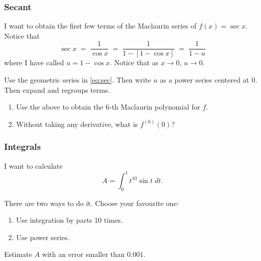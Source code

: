 \documentclass[14pt]{beamer}
\begin{document}
	\begin{frame}[t]
		\fontsize{13}{13}\selectfont
		\frametitle{Secant}

		I want to obtain the first few terms of the Maclaurin series of $\displaystyle
		f(x) = \sec x$. Notice that
		\begin{equation}
			\label{eq:sec}\sec x \; = \; \frac{1}{\cos x}\; = \; \frac{1}{1 - \left[ 1
			- \cos x\right]}\; = \; \frac{1}{1-u}
		\end{equation}
		where I have called $\displaystyle u = 1 - \cos x$. \; Notice that as $x \to
		0$, $u \to 0$.
		\vspace{.2cm}

		Use the geometric series in \eqref{eq:sec}. Then write $u$ as a power series
		centered at 0. Then expand and regroups terms.
		\vspace{.5cm}

		\begin{enumerate}
			\item Use the above to obtain the 6-th Maclaurin polynomial for $f$.

			\item Without taking any derivative, what is $\displaystyle f^{(6)}(0)$?
		\end{enumerate}
	\end{frame}





	\begin{frame}[t]
		\frametitle{Integrals}

		I want to calculate
		\[
			A = \int_{0}^{1}t^{10}\sin t \; dt.
		\]

		There are two ways to do it. Choose your favourite one:
		\begin{enumerate}
			\item Use integration by parts 10 times.

			\item Use power series.
		\end{enumerate}
		\hrulefill
		\vspace{.5cm}

		Estimate $A$ with an error smaller than $0.001$.
	\end{frame}
\end{document}
